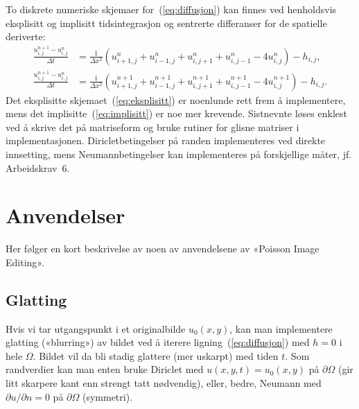 \documentclass[11pt,a4paper]{article}
\begin{document}
To diskrete numeriske skjemaer for~(\ref{eq:diffusjon}) kan finnes ved henholdsvis eksplisitt og implisitt tidsintegrasjon og sentrerte differanser for de spatielle deriverte:
\begin{align}
  \frac{u^{n+1}_{i,j} - u^n_{i,j}}{\Delta t} &= \frac{1}{\Delta x^2}
                                               (u^n_{i+1,j} +
                                               u^n_{i-1,j} +
                                               u^n_{i,j+1} +
                                               u^n_{i,j-1} -4 
                                               u^n_{i,j}) - h_{i,j},
                                               \label{eq:eksplisitt}  \\
  \frac{u^{n+1}_{i,j} - u^n_{i,j}}{\Delta t} &= \frac{1}{\Delta x^2}
                                               (u^{n+1}_{i+1,j} +
                                               u^{n+1}_{i-1,j} +
                                               u^{n+1}_{i,j+1} +
                                               u^{n+1}_{i,j-1} -4 
                                               u^{n+1}_{i,j}) - h_{i,j}.
                                               \label{eq:implisitt}
\end{align}
Det eksplisitte skjemaet~(\ref{eq:eksplisitt}) er noenlunde rett frem å implementere, mens det implisitte~(\ref{eq:implisitt}) er noe mer krevende. Sistnevnte løses enklest ved å skrive det på matriseform og bruke rutiner for glisne matriser i implementasjonen. Diricletbetingelser på randen implementeres ved direkte innsetting, mens Neumannbetingelser kan implementeres på forskjellige måter, jf. Arbeidskrav~6.

\section{Anvendelser}
\label{sec:anvendelser}

Her følger en kort beskrivelse av noen av anvendelsene av «Poisson Image Editing».

\subsection{Glatting}
\label{sec:glatting}

Hvis vi tar utgangspunkt i et originalbilde $u_0(x, y)$, kan man implementere glatting («blurring») av bildet ved å iterere ligning~(\ref{eq:diffusjon}) med $h = 0$ i hele $\Omega$. Bildet vil da bli stadig glattere (mer uskarpt) med tiden $t$. Som randverdier kan man enten bruke Diriclet med $u(x, y, t) = u_0(x, y)$ på $\partial\Omega$ (gir litt skarpere kant enn strengt tatt nødvendig), eller, bedre, Neumann med $\partial u/\partial n = 0$ på $\partial\Omega$ (symmetri).
\end{document}

